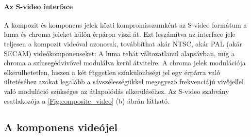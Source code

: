 \paragraph{Az S-video interface}
A kompozit és komponens jelek közti kompromisszumként az S-video formátum a luma és chroma jeleket külön érpáron viszi át.
Ezt leszámítva az interface jele teljesen a kompozit videóval azonosak, továbbíthat akár NTSC, akár PAL (akár SECAM) videókomponenseket:
A luma tehát változatlanul alapsávban, míg a chroma a színsegédvivővel modulálva kerül átvitelre.
A chroma jelek modulációja elkerülhetetlen, hiszen a két független színkülönbségi jel egy érpárra való ültetéséhez azokat legalább a sávszélességükkel megegyező frekvenciájú vivőjellel való moduláció szükséges az átlapolódás elkerüléséhez.
Az S-video szabvány csatlakozója a \ref{Fig:composite_video} (b) ábrán látható.

\subsection{A komponens videójel}
